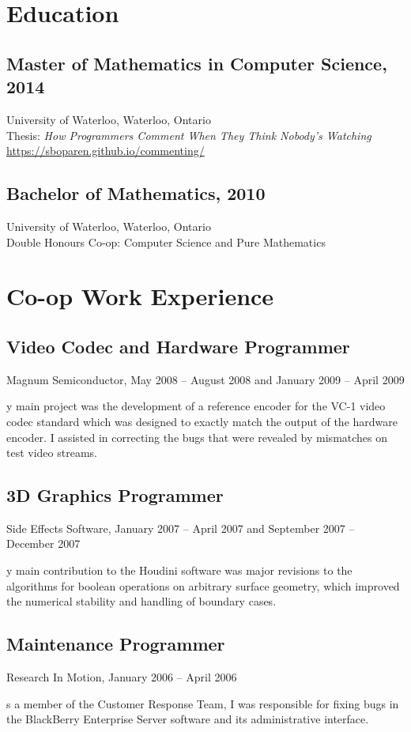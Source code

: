 \documentclass[12pt,letterpaper,oneside]{article}
\def\entry#1{\subsection*{#1}}
\def\paragraph#1\par{\begin{itemize}\item[]#1\end{itemize}}
\let\oldsection\section
\def\section#1{\oldsection*{#1}}
\begin{document}
\section{Education}

\entry{Master of Mathematics
in Computer Science,
2014}
University of Waterloo, Waterloo, Ontario
\\ Thesis:
\textit{How Programmers Comment When They Think Nobody's Watching}
\\ \url{https://sboparen.github.io/commenting/}

\entry{Bachelor of Mathematics, 2010}
University of Waterloo, Waterloo, Ontario
\\ Double Honours Co-op: Computer Science and Pure Mathematics

\section{Co-op Work Experience}

\entry{Video Codec and Hardware Programmer}
Magnum Semiconductor,
May 2008 -- August 2008 and January 2009 -- April 2009
\paragraph
My main project was the development of
a reference encoder for the VC-1 video codec standard
which was designed to exactly match the output of the hardware encoder.
I assisted in correcting the bugs that were revealed by mismatches
on test video streams.

\entry{3D Graphics Programmer}
Side Effects Software,
January 2007 -- April 2007 and September 2007 -- December 2007
\paragraph
My main contribution to the Houdini software was
major revisions to the algorithms for
boolean operations on arbitrary surface geometry,
which improved the numerical stability and
handling of boundary cases.

\entry{Maintenance Programmer}
Research In Motion,
January 2006 -- April 2006
\paragraph
As a member of the Customer Response Team,
I was responsible for fixing bugs in the BlackBerry Enterprise Server
software and its administrative interface.
\end{document}
